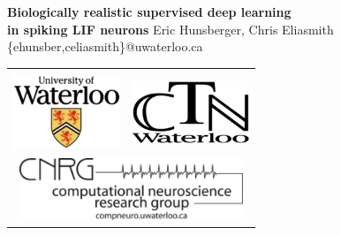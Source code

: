 \documentclass[landscape,a0paper,fontscale=0.3]{baposter}
\begin{document}
\begin{poster}
{    %
    \textbf{Biologically realistic supervised deep learning\\in spiking LIF neurons}\vspace{0.5em}
  }
  {
    Eric Hunsberger, Chris Eliasmith\\[0.2em]
    \{ehunsber,celiasmith\}@uwaterloo.ca\\[0.4em]
  }
  {%
    \begin{tabular}{cc}
      \relax\\
      \includegraphics[height=6.0em]{uwaterloo.png} &
      \includegraphics[height=5.0em]{ctn.png}\\
      \multicolumn{2}{c}{
        \includegraphics[height=5.0em]{cnrg.png}}
    \end{tabular}
  }

    \newcommand{\colouredcircle}{%
      \tikz{\useasboundingbox (-0.2em,-0.32em) rectangle(0.2em,0.32em);
        \draw[draw=black,fill=headerfade,line width=0.03em] (0,0) circle(0.18em);}}


\end{poster}
\end{document}
